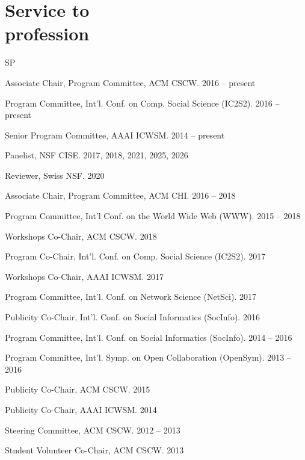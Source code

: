 \documentclass{cv}
\begin{document}
	\section{Service to\\profession}
	\begin{entries}{SP}
		\item Associate Chair, Program Committee, ACM CSCW. \hfill 2016 -- present
		\item Program Committee, Int'l. Conf. on Comp. Social Science (IC2S2). \hfill 2016 -- present
		\item Senior Program Committee, AAAI ICWSM. \hfill 2014 -- present
		\item Panelist, NSF CISE. \hfill 2017, 2018, 2021, 2025, 2026
		\item Reviewer, Swiss NSF. \hfill 2020
		\item Associate Chair, Program Committee, ACM CHI. \hfill 2016 -- 2018
		\item Program Committee, Int'l Conf. on the World Wide Web (WWW). \hfill 2015 -- 2018
		\item Workshops Co-Chair, ACM CSCW. \hfill 2018
		\item Program Co-Chair, Int'l. Conf. on Comp. Social Science (IC2S2). \hfill 2017
		\item Workshops Co-Chair, AAAI ICWSM. \hfill 2017
		\item Program Committee, Int'l. Conf. on Network Science (NetSci). \hfill 2017
		\item Publicity Co-Chair, Int'l. Conf. on Social Informatics (SocInfo). \hfill 2016
		\item Program Committee, Int'l. Conf. on Social Informatics (SocInfo). \hfill 2014 -- 2016
		\item Program Committee, Int'l. Symp. on Open Collaboration (OpenSym). \hfill 2013 -- 2016
		\item Publicity Co-Chair, ACM CSCW. \hfill 2015
		\item Publicity Co-Chair, AAAI ICWSM. \hfill 2014
		\item Steering Committee, ACM CSCW. \hfill 2012 -- 2013
		\item Student Volunteer Co-Chair, ACM CSCW. \hfill 2013
	\end{entries}
\end{document}
